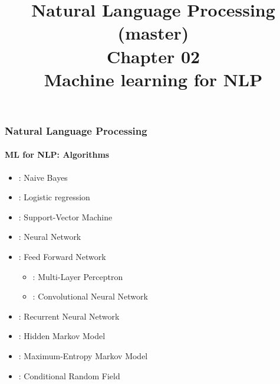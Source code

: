 \documentclass[xcolor=table]{beamer}
\title[ESI - NLP(master): 02- ML for NLP]%
{Natural Language Processing (master)\\Chapter 02\\Machine learning for NLP}
\begin{document}
	
%		
%		
	
	\begin{frame}
		\frametitle{Natural Language Processing}
		\framesubtitle{ML for NLP: Algorithms}
		
		\begin{itemize}
			\item {}: Naive Bayes
			\item {}: Logistic regression
			\item {}: Support-Vector Machine
			\item {}: Neural Network
			\item {}: Feed Forward Network
			\begin{itemize}
				\item {}: Multi-Layer Perceptron
				\item {}: Convolutional Neural Network
			\end{itemize}
			\item {}: Recurrent Neural Network
			\item {}: Hidden Markov Model
			\item {}: Maximum-Entropy Markov Model
			\item {}: Conditional Random Field
		\end{itemize}
		
	\end{frame}
	
\end{document}
